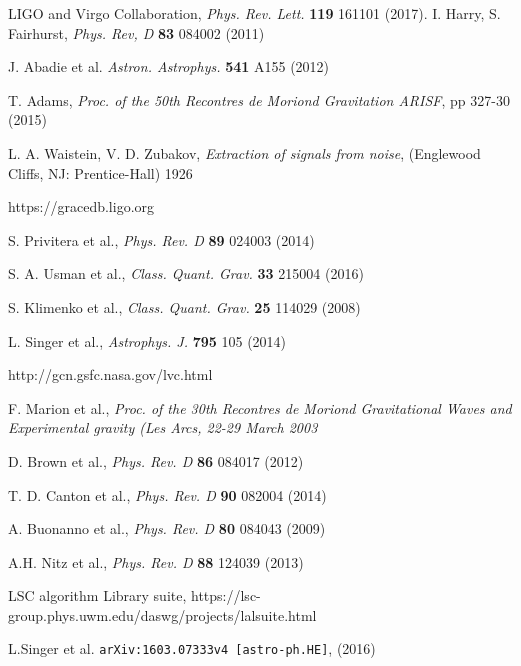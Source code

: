 \documentclass[aps, prd, twocolumn, superscriptaddress, nofootinbib]{revtex4-1}
\begin{document}
\begin{thebibliography}{10}


LIGO and Virgo Collaboration,
 {\em Phys. Rev. Lett.} {\bf 119} 161101 (2017).
 I. Harry, S. Fairhurst, 
 {\em Phys. Rev, D} {\bf 83} 084002 (2011)
 
 
 
 J. Abadie et al.
 {\emph{Astron. Astrophys.}} {\bf 541} A155 (2012)
 
 T. Adams,
 {\emph{Proc. of the 50th Recontres de Moriond Gravitation ARISF}}, pp 327-30 (2015)
 
 L. A. Waistein, V. D. Zubakov, 
 {\emph{Extraction of signals from noise}},
 (Englewood Cliffs, NJ: Prentice-Hall)
 1926
 
 https://gracedb.ligo.org
 
 S. Privitera et al.,
 {\emph{Phys. Rev. D}} {\bf 89} 024003 (2014)
 
 S. A. Usman et al.,
 {\emph{Class. Quant. Grav.}} {\bf 33} 215004 (2016)
 
 S. Klimenko et al.,
 {\emph{Class. Quant. Grav.}} {\bf 25} 114029 (2008)
 
 L. Singer et al.,
 {\emph{Astrophys. J.}} {\bf 795} 105 (2014)
 
 http://gcn.gsfc.nasa.gov/lvc.html
 
 F. Marion et al.,
 {\emph{Proc. of the 30th Recontres de Moriond Gravitational Waves and Experimental gravity (Les Arcs, 22-29 March 2003}}
 
 D. Brown et al.,
 {\emph{Phys. Rev. D}} {\bf 86} 084017 (2012)
 
 T. D. Canton et al.,
 {\emph{Phys. Rev. D}} {\bf 90} 082004 (2014)
 
 A. Buonanno et al.,
 {\emph{Phys. Rev. D}} {\bf 80} 084043 (2009)
 
 A.H. Nitz et al.,
 {\emph{Phys. Rev. D}} {\bf 88} 124039 (2013)
 
 LSC algorithm Library suite,
 https://lsc-group.phys.uwm.edu/daswg/projects/lalsuite.html
 
 
 L.Singer et al. 
 {\tt arXiv:1603.07333v4 [astro-ph.HE]}, (2016)
 

\end{thebibliography}
\end{document}

